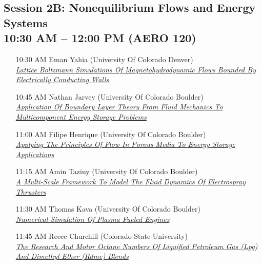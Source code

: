 \subsection*{Session 2B: Nonequilibrium Flows and Energy Systems \\ 10:30 AM  -- 12:00 PM (AERO 120)}
\begin{enumerate}
\item [10:30 AM] Eman Yahia (University Of Colorado Denver) \\ \hyperlink{EmanYahia}{\it Lattice Boltzmann Simulations Of Magnetohydrodynamic Flows Bounded By Electrically Conducting Walls }
\item [10:45 AM] Nathan Jarvey (University Of Colorado Boulder) \\ \hyperlink{NathanJarvey}{\it Application Of Boundary Layer Theory From Fluid Mechanics To Multicomponent Energy Storage Problems }
\item [11:00 AM] Filipe Henrique (University Of Colorado Boulder) \\ \hyperlink{FilipeHenrique}{\it Applying The Principles Of Flow In Porous Media To Energy Storage Applications }
\item [11:15 AM] Amin Taziny (University Of Colorado Boulder) \\ \hyperlink{AminTaziny}{\it A Multi-Scale Framework To Model The Fluid Dynamics Of Electrospray Thrusters }
\item [11:30 AM] Thomas Kava (University Of Colorado Boulder) \\ \hyperlink{ThomasKava}{\it Numerical Simulation Of Plasma Fueled Engines }
\item [11:45 AM] Reece Churchill (Colorado State University) \\ \hyperlink{ReeceChurchill}{\it The Research And Motor Octane Numbers Of Liquified Petroleum Gas (Lpg) And Dimethyl Ether (Rdme) Blends }
\end{enumerate}
